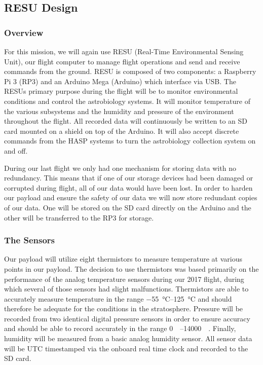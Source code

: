 \subsection{RESU Design}
\label{sec:ElectronicsDesign}

\subsubsection{Overview}

For this mission, we will again use RESU (Real-Time Environmental Sensing Unit), our flight computer to manage flight operations and send and receive commands from the ground. RESU is composed of two components: a Raspberry Pi 3 (RP3) and an Arduino Mega (Arduino) which interface via USB. The RESUs primary purpose during the flight will be to monitor environmental conditions and control the astrobiology systems. It will monitor temperature of the various subsystems and the humidity and pressure of the environment throughout the flight. All recorded data will continuously be written to an SD card mounted on a shield on top of the Arduino. It will also accept discrete commands from the HASP systems to turn the astrobiology collection system on and off.

 During our last flight we only had one mechanism for storing data with no redundancy. This means that if one of our storage devices had been damaged or corrupted during flight, all of our data would have been lost. In order to harden our payload and ensure the safety of our data we will now store redundant copies of our data. One will be stored on the SD card directly on the Arduino and the other will be transferred to the RP3 for storage.

\subsubsection{The Sensors}

Our payload will utilize eight thermistors to measure temperature at various points in our payload. The decision to use thermistors was based primarily on the performance of the analog temperature sensors during our 2017 flight, during which several of those sensors had slight malfunctions. Thermistors are able to accurately measure temperature in the range \SIrange{-55}{125}{\celsius} and should therefore be adequate for the conditions in the stratosphere. Pressure will be recorded from two identical digital pressure sensors in order to ensure accuracy and should be able to record accurately in the range \SIrange{0}{14000}{\milli\bara}. Finally, humidity will be measured from a basic analog humidity sensor. All sensor data will be UTC timestamped via the onboard real time clock and recorded to the SD card.

